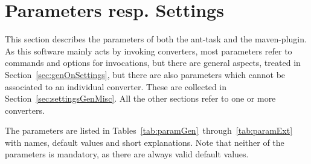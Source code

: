 
\chapter{Parameters resp. Settings}\label{chap:settings}

This section describes the parameters 
of both the ant-task and the maven-plugin. 
As this software mainly acts by invoking converters, 
most parameters refer to commands and options for invocations, 
but there are general aspects, treated in Section~\ref{sec:genOnSettings}, 
but there are also parameters which cannot be associated to an individual converter. 
These are collected in Section~\ref{sec:settingsGenMisc}. 
All the other sections refer to one or more converters. 

The parameters are listed 
in Tables~\ref{tab:paramGen}~through~\ref{tab:paramExt} 
with names, default values and short explanations. 
Note that neither of the parameters is mandatory, 
as there are always valid default values. 

